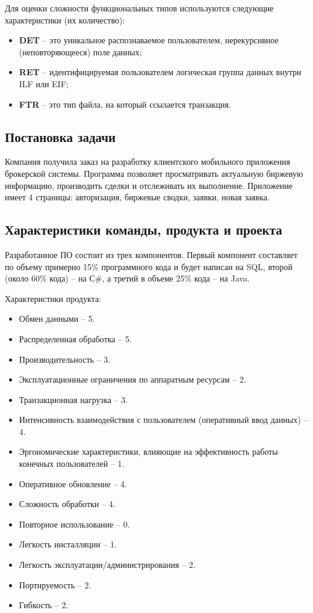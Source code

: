 Для оценки сложности функциональных типов используются следующие характеристики (их количество):

\begin{itemize}
    \item \textbf{DET} -- это уникальное распознаваемое пользователем, нерекурсивное (неповторяющееся) поле данных;
    \item \textbf{RET} -- идентифицируемая пользователем логическая группа данных внутри ILF или EIF;
    \item \textbf{FTR} -- это тип файла, на который ссылается транзакция.
\end{itemize}

\subsection{Постановка задачи}

Компания получила заказ на разработку клиентского мобильного приложения брокерской системы. Программа позволяет просматривать актуальную биржевую информацию, производить сделки и отслеживать их выполнение. Приложение имеет 4 страницы: авторизация, биржевые сводки, заявки, новая заявка.

\subsection{Характеристики команды, продукта и
проекта}

Разработанное ПО состоит из трех компонентов. Первый компонент
составляет по объему примерно 15\% программного кода и будет написан на
SQL, второй (около 60\% кода) -- на С\#, а третий в объеме 25\% кода -- на Java.

Характеристики продукта:

\begin{itemize}
    \item Обмен данными -- 5.
    \item Распределенная обработка -- 5.
    \item Производительность -- 3.
    \item Эксплуатационные ограничения по аппаратным ресурсам -- 2.
    \item Транзакционная нагрузка -- 3.
    \item Интенсивность взаимодействия с пользователем (оперативный ввод данных) -- 4.
    \item Эргономические характеристики, влияющие на эффективность работы конечных пользователей -- 1.
    \item Оперативное обновление -- 4.
    \item Сложность обработки -- 4.
    \item Повторное использование -- 0.
    \item Легкость инсталляции -- 1.
    \item Легкость эксплуатации/администрирования -- 2.
    \item Портируемость -- 2.
    \item Гибкость -- 2.
\end{itemize}

